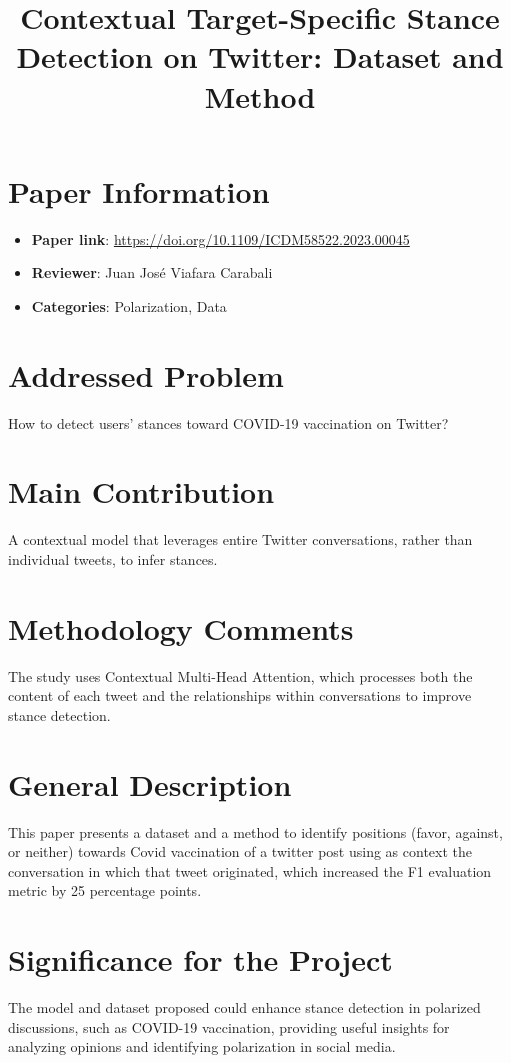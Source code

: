 \documentclass{article}
\title{Contextual Target-Specific Stance Detection on Twitter: Dataset and Method}
\author{}
\date{}
\begin{document}
\maketitle

\section*{Paper Information}
\begin{itemize}
    \item \textbf{Paper link}: \url{https://doi.org/10.1109/ICDM58522.2023.00045}
    \item \textbf{Reviewer}: Juan José Viafara Carabali
    \item \textbf{Categories}: Polarization, Data
\end{itemize}

\section*{Addressed Problem}
How to detect users' stances toward COVID-19 vaccination on Twitter?

\section*{Main Contribution}
A contextual model that leverages entire Twitter conversations, rather than individual tweets, to infer stances.

\section*{Methodology Comments}
The study uses Contextual Multi-Head Attention, which processes both the content of each tweet and the relationships within conversations to improve stance detection.

\section*{General Description}
This paper presents a dataset and a method to identify positions (favor, against, or neither) towards Covid vaccination of a twitter post using as context the conversation in which that tweet originated, which increased the F1 evaluation metric by 25 percentage points.

\section*{Significance for the Project}
The model and dataset proposed could enhance stance detection in polarized discussions, such as COVID-19 vaccination, providing useful insights for analyzing opinions and identifying polarization in social media.
\end{document}
